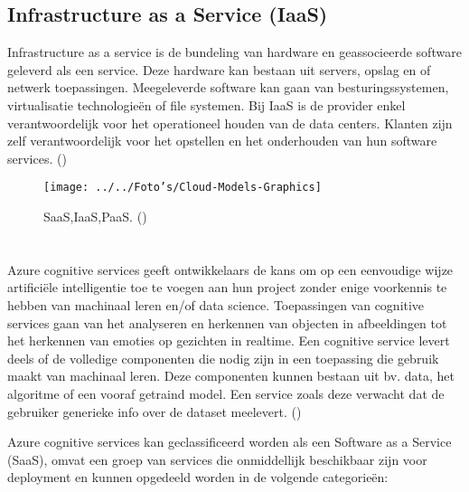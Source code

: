 \subsection{Infrastructure as a Service (IaaS)}
Infrastructure as a service is de bundeling van hardware en geassocieerde software geleverd als een service. Deze hardware kan bestaan uit servers, opslag en of netwerk toepassingen. Meegeleverde software kan gaan van besturingssystemen, virtualisatie technologieën of file systemen. Bij IaaS is de provider enkel verantwoordelijk voor het operationeel houden van de data centers. Klanten zijn zelf verantwoordelijk voor het opstellen en het onderhouden van hun software services. (\cite{Bhardwaj2010})
\begin{figure}[h]

	\texttt{[image: ../../Foto's/Cloud-Models-Graphics]}
	\captionsetup{justification=centering,margin=2cm}
	\caption{SaaS,IaaS,PaaS. (\cite{Wright2019})}
	\centering
\end{figure}
\section{}
Azure cognitive services geeft ontwikkelaars de kans om op een eenvoudige wijze artificiële intelligentie toe te voegen aan hun project zonder enige voorkennis te hebben van machinaal leren en/of data science. Toepassingen van cognitive services gaan van het analyseren en herkennen van objecten in afbeeldingen tot het herkennen van emoties op gezichten in realtime.  Een cognitive service levert deels of de volledige componenten die nodig zijn in een toepassing die gebruik maakt van machinaal leren. Deze componenten kunnen bestaan uit bv. data, het algoritme of een vooraf getraind model. Een service zoals deze verwacht dat de gebruiker generieke info over de dataset meelevert.  (\cite{Microsoft2020b}) \newline \newline



Azure cognitive services kan geclassificeerd worden als een Software as a Service (SaaS), omvat een groep van services die onmiddellijk beschikbaar zijn voor deployment en kunnen opgedeeld worden in de volgende categorieën:


